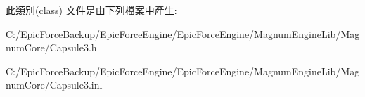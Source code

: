 此類別(class) 文件是由下列檔案中產生\+:\begin{DoxyCompactItemize}
\item 
C\+:/\+Epic\+Force\+Backup/\+Epic\+Force\+Engine/\+Epic\+Force\+Engine/\+Magnum\+Engine\+Lib/\+Magnum\+Core/Capsule3.\+h\item 
C\+:/\+Epic\+Force\+Backup/\+Epic\+Force\+Engine/\+Epic\+Force\+Engine/\+Magnum\+Engine\+Lib/\+Magnum\+Core/Capsule3.\+inl\end{DoxyCompactItemize}
